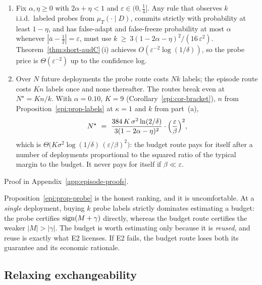 \begin{proposition}\label{epi:prop-probe}
\begin{enumerate}
\item[\textnormal{(a)}] Fix $\alpha,\eta\ge0$ with $2\alpha+\eta<1$ and $\varepsilon\in(0,\tfrac14]$.
Any rule that observes $k$ i.i.d.\ labeled probes from $\mu_T(\cdot\mid D)$, commits strictly with
probability at least $1-\eta$, and has false-adapt and false-freeze probability at most $\alpha$
whenever $|\bar a-\tfrac12|=\varepsilon$, must use
$k\ \ge\ 3(1-2\alpha-\eta)^2/(16\,\varepsilon^{2})$.
Theorem~\ref{thm:short-audC}\,(i) achieves $O(\varepsilon^{-2}\log(1/\delta))$, so the probe price
is $\Theta(\varepsilon^{-2})$ up to the confidence log.
\item[\textnormal{(b)}] Over $N$ future deployments the probe route costs $Nk$ labels; the episode
route costs $Kn$ labels once and none thereafter. The routes break even at $N^\star=Kn/k$. With
$\alpha=0.10$, $K=9$ (Corollary~\ref{epi:cor-bracket}), $n$ from
Proposition~\ref{epi:prop-labels} at $\kappa=1$ and $k$ from part~(a),
\[
N^\star\ =\ \frac{384\,K\,\sigma^{2}\ln(2/\delta)}{3(1-2\alpha-\eta)^{2}}
\cdot\Bigl(\frac{\varepsilon}{\beta}\Bigr)^{2},
\]
which is $\Theta\bigl(K\sigma^2\log(1/\delta)\,(\varepsilon/\beta)^2\bigr)$: the budget route pays
for itself after a number of deployments proportional to the squared ratio of the typical margin to
the budget. It never pays for itself if $\beta\ll\varepsilon$.
\end{enumerate}
Proof in Appendix~\ref{app:episode-proofs}.
\end{proposition}

\noindent Proposition~\ref{epi:prop-probe} is the honest ranking, and it is uncomfortable. At a
\emph{single} deployment, buying $k$ probe labels strictly dominates estimating a budget: the probe
certifies $\operatorname{sign}(M+\gamma)$ directly, whereas the budget route certifies the weaker $|M|>|\gamma|$.
The budget is worth estimating only because it is \emph{reused}, and reuse is exactly what E2
licenses. If E2 fails, the budget route loses both its guarantee and its economic rationale.

\subsection{Relaxing exchangeability}

